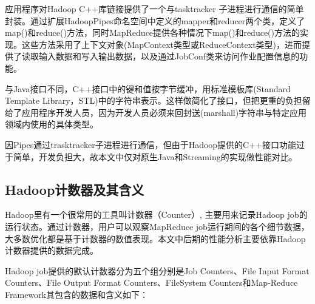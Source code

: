应用程序对Hadoop C++库链接提供了一个与tasktracker 子进程进行通信的简单封装。通过扩展HadoopPipes命名空间中定义的mapper和reducer两个类，定义了map()和reduce()方法，同时MapReduce提供各种情况下map()和reduce()方法的实现。这些方法采用了上下文对象(MapContext类型或ReduceContext类型)，进而提供了读取输入数据和写入输出数据，以及通过JobConf类来访问作业配置信息的功能。

与Java接口不同，C++接口中的键和值按字节缓冲，用标准模板库(Standard Template Library，STL)中的字符串表示。这样做简化了接口，但把更重的负担留给了应用程序开发人员，因为开发人员必须来回封送(marshall)字符串与特定应用领域内使用的具体类型。

因Pipes通过trasktracker子进程进行通信，但由于Hadoop提供的C++接口功能过于简单，开发负担大，故本文中仅对原生Java和Streaming的实现做性能对比。

\subsection[Hadoop计数器及其含义]{Hadoop计数器及其含义\cite{site:hadoop-counter}}
Hadoop里有一个很常用的工具叫计数器（Counter）, 主要用来记录Hadoop job的运行状态。通过计数器，用户可以观察MapReduce job运行期间的各个细节数据，大多数优化都是基于计数器的数值表现。本文中后期的性能分析主要依靠Hadoop计数器提供的数据完成。

Hadoop job提供的默认计数器分为五个组分别是Job Counters、File Input Format Counters、File Output Format Counters、FileSystem Counters和Map-Reduce Framework其包含的数据和含义如下：

